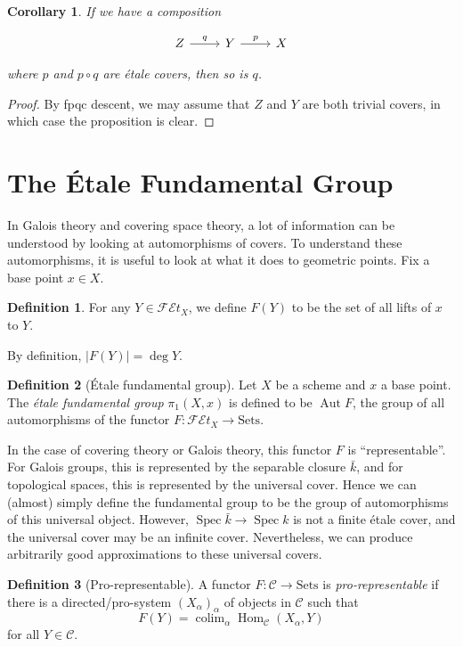 \documentclass{shortart}
\newtheorem*{cor}{Corollary}
\theoremstyle{definition}
\newtheorem*{defi}{Definition}
\newcommand\FEt[1]{\mathscr{FE}t_{#1}}
\newcommand\Sets{\mathrm{Sets}}
\DeclareMathOperator\Spec{Spec}
\DeclareMathOperator\Aut{Aut}
\DeclareMathOperator\Hom{Hom}
\DeclareMathOperator*\colim{colim}
\begin{document}
\begin{cor}
  If we have a composition
  \begin{useimager}
    \[
      \begin{tikzcd}
        Z \ar[r, "q"] & Y \ar[r, "p"] & X
      \end{tikzcd}
    \]
  \end{useimager}
  where $p$ and $p \circ q$ are \'etale covers, then so is $q$.
\end{cor}

\begin{proof}
  By fpqc descent, we may assume that $Z$ and $Y$ are both trivial covers, in which case the proposition is clear.
\end{proof}

\section{The \'Etale Fundamental Group}
In Galois theory and covering space theory, a lot of information can be understood by looking at automorphisms of covers. To understand these automorphisms, it is useful to look at what it does to geometric points. Fix a base point $x \in X$.

\begin{defi}
  For any $Y \in \FEt{X}$, we define $F(Y)$ to be the set of all lifts of $x$ to $Y$.
\end{defi}
By definition, $|F(Y)| = \deg Y$.

\begin{defi}[\'Etale fundamental group]
  Let $X$ be a scheme and $x$ a base point. The \emph{\'etale fundamental group} $\pi_1(X, x)$ is defined to be $\Aut F$, the group of all automorphisms of the functor $F: \FEt{X} \to \Sets$.
\end{defi}
In the case of covering theory or Galois theory, this functor $F$ is ``representable''. For Galois groups, this is represented by the separable closure $\bar{k}$, and for topological spaces, this is represented by the universal cover. Hence we can (almost) simply define the fundamental group to be the group of automorphisms of this universal object. However, $\Spec \bar{k} \to \Spec k$ is not a finite \'etale cover, and the universal cover may be an infinite cover. Nevertheless, we can produce arbitrarily good approximations to these universal covers.

\begin{defi}[Pro-representable]
  A functor $F: \mathcal{C} \to \Sets$ is \emph{pro-representable} if there is a directed/pro-system $(X_\alpha)_\alpha$ of objects in $\mathcal{C}$ such that
  \[
    F(Y) = \colim_\alpha \Hom_{\mathcal{C}}(X_\alpha, Y)
  \]
  for all $Y \in \mathcal{C}$.
\end{defi}
\end{document}
